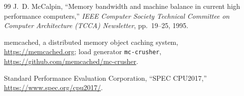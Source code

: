 \documentclass[11pt,a4paper]{article}
\begin{document}
\begin{thebibliography}{99}
J.~D. McCalpin,
\newblock ``Memory bandwidth and machine balance in current high performance computers,''
\newblock \textit{IEEE Computer Society Technical Committee on Computer Architecture (TCCA) Newsletter}, pp.~19--25, 1995.

memcached, a distributed memory object caching system, \url{https://memcached.org}; load generator \texttt{mc-crusher}, \url{https://github.com/memcached/mc-crusher}.

Standard Performance Evaluation Corporation, ``SPEC CPU2017,'' \url{https://www.spec.org/cpu2017/}.

\end{thebibliography}
\end{document}
